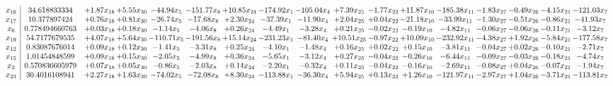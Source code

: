 \documentclass[9pt]{article}
\begin{document}
 \[\begin{array}{c| c c@{\hskip 2pt} c@{\hskip 2pt} c@{\hskip 2pt} c@{\hskip 2pt} c@{\hskip 2pt} c@{\hskip 2pt} c@{\hskip 2pt} c@{\hskip 2pt} c@{\hskip 2pt} c@{\hskip 2pt} c@{\hskip 2pt} c@{\hskip 2pt} c@{\hskip 2pt} c@{\hskip 2pt} c@{\hskip 2pt} }
 x_{16}   &  34.618833334 & +  1.87 x_{18} & +  5.55 x_{30} & -44.94 x_{5} & -151.77 x_{8} & + 10.85 x_{24} & -174.92 x_{1} & -105.04 x_{4} & +  7.39 x_{25} & -1.77 x_{22} & + 11.87 x_{10} & -185.38 x_{11} & -1.83 x_{27} & -0.49 x_{26} & -4.15 x_{21} & -121.03 x_{7}\\
 x_{17}   &  10.377897424 & +  0.76 x_{18} & +  0.81 x_{30} & -26.74 x_{5} & -17.68 x_{8} & +  2.30 x_{24} & -37.39 x_{1} & -11.90 x_{4} & +  2.04 x_{25} & +  0.04 x_{22} & -21.18 x_{10} & -33.99 x_{11} & -1.30 x_{27} & -0.51 x_{26} & -0.86 x_{21} & -41.93 x_{7}\\
 x_{6}   &  0.778494660763 & +  0.03 x_{18} & +  0.18 x_{30} & -1.14 x_{5} & -4.06 x_{8} & +  0.26 x_{24} & -4.49 x_{1} & -3.28 x_{4} & +  0.21 x_{25} & -0.02 x_{22} & -0.19 x_{10} & -4.82 x_{11} & -0.06 x_{27} & -0.06 x_{26} & -0.11 x_{21} & -3.12 x_{7}\\
 x_{19}   &  54.7177679535 & +  4.07 x_{18} & +  5.64 x_{30} & -110.71 x_{5} & -191.56 x_{8} & + 15.14 x_{24} & -231.23 x_{1} & -81.40 x_{4} & + 10.51 x_{25} & -0.97 x_{22} & + 10.09 x_{10} & -232.92 x_{11} & -4.38 x_{27} & +  1.92 x_{26} & -5.84 x_{21} & -177.58 x_{7}\\
 x_{12}   &  0.83087676014 & +  0.09 x_{18} & +  0.12 x_{30} & -1.41 x_{5} & -3.31 x_{8} & +  0.25 x_{24} & -4.10 x_{1} & -1.48 x_{4} & +  0.16 x_{25} & +  0.02 x_{22} & +  0.15 x_{10} & -3.81 x_{11} & -0.04 x_{27} & +  0.02 x_{26} & -0.10 x_{21} & -2.71 x_{7}\\
 x_{15}   &  1.01454848599 & +  0.09 x_{18} & +  0.15 x_{30} & -2.05 x_{5} & -4.99 x_{8} & +  0.36 x_{24} & -5.65 x_{1} & -3.12 x_{4} & +  0.27 x_{25} & -0.04 x_{22} & -0.26 x_{10} & -6.44 x_{11} & -0.09 x_{27} & -0.03 x_{26} & -0.18 x_{21} & -4.74 x_{7}\\
 x_{2}   &  0.570836605979 & +  0.07 x_{18} & +  0.05 x_{30} & -0.86 x_{5} & -2.03 x_{8} & +  0.14 x_{24} & -2.20 x_{1} & -0.32 x_{4} & +  0.11 x_{25} & -0.04 x_{22} & -0.16 x_{10} & -2.69 x_{11} & -0.08 x_{27} & +  0.04 x_{26} & -0.07 x_{21} & -1.94 x_{7}\\
 x_{23}   &  30.4016108941 & +  2.27 x_{18} & +  1.63 x_{30} & -74.02 x_{5} & -72.08 x_{8} & +  8.30 x_{24} & -113.88 x_{1} & -36.30 x_{4} & +  5.94 x_{25} & +  0.13 x_{22} & +  1.26 x_{10} & -121.97 x_{11} & -2.97 x_{27} & +  1.04 x_{26} & -3.71 x_{21} & -113.81 x_{7}\\

\end{array}\]
\end{document}
